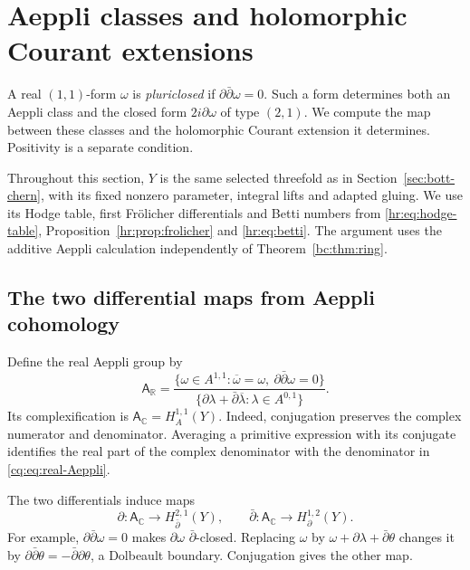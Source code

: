 \section{Aeppli classes and holomorphic Courant extensions}
\label{sec:courant}

A real $(1,1)$-form $\omega$ is \emph{pluriclosed} if
$\partial\bar\partial\omega=0$.
Such a form determines both an Aeppli class and the closed form
$2i\partial\omega$ of type $(2,1)$.
We compute the map between these classes and the holomorphic
Courant extension it determines. Positivity is a separate condition.

Throughout this section, $Y$ is the same selected threefold
as in Section~\ref{sec:bott-chern}, with its fixed nonzero
parameter, integral lifts and adapted gluing.
We use its Hodge table, first Fr\"olicher differentials and
Betti numbers from \eqref{hr:eq:hodge-table},
Proposition~\ref{hr:prop:frolicher} and \eqref{hr:eq:betti}.
The argument uses the additive Aeppli calculation independently
of Theorem~\ref{bc:thm:ring}.

\subsection{The two differential maps from Aeppli cohomology}

Define the real Aeppli group by
\begin{equation}\label{cq:eq:real-Aeppli}
 \mathsf A_{\mathbb R}
 =\frac{\{\omega\in A^{1,1}:\overline\omega=\omega,
                         \ \partial\bar\partial\omega=0\}}
        {\{\partial\lambda+\bar\partial\overline\lambda:
                                             \lambda\in A^{0,1}\}}.
\end{equation}
Its complexification is
$\mathsf A_{\mathbb C}=H_A^{1,1}(Y)$.
Indeed, conjugation preserves the complex numerator and denominator.
Averaging a primitive expression with its conjugate identifies
the real part of the complex denominator with the denominator
in \eqref{cq:eq:real-Aeppli}.

The two differentials induce maps
\begin{equation}\label{cq:eq:two-differentials}
 \partial:\mathsf A_{\mathbb C}\longrightarrow
                         H_{\bar\partial}^{2,1}(Y),\qquad
 \bar\partial:\mathsf A_{\mathbb C}\longrightarrow
                         H_\partial^{1,2}(Y).
\end{equation}
For example, $\partial\bar\partial\omega=0$ makes
$\partial\omega$ $\bar\partial$-closed.
Replacing $\omega$ by $\omega+\partial\lambda+\bar\partial\theta$
changes it by
$\partial\bar\partial\theta=-\bar\partial\partial\theta$,
a Dolbeault boundary. Conjugation gives the other map.


